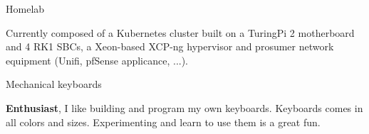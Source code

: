 

\begin{cventries}

  \cventry
    {Homelab} %
    {} %
    {} %
    {} %
    {
      \begin{cvitems} %
        \item {Currently composed of a Kubernetes cluster built on a TuringPi 2 motherboard and 4 RK1 SBCs, a Xeon-based XCP-ng hypervisor and prosumer network equipment (Unifi, pfSense applicance, ...).}
      \end{cvitems}
    }

  \cventry
    {Mechanical keyboards} %
    {} %
    {} %
    {} %
    {
      \begin{cvitems} %
        \item {\textbf{Enthusiast}, I like building and program my own keyboards. Keyboards comes in all colors and sizes. Experimenting and learn to use them is a great fun.}
      \end{cvitems}
    }


\end{cventries}
